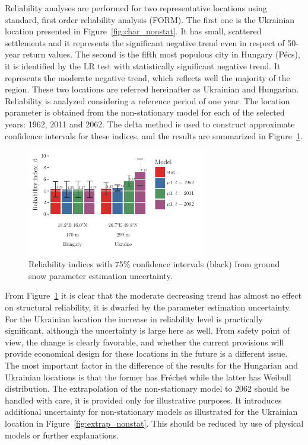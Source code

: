 Reliability analyses are performed for two representative locations using standard, first order reliability analysis (FORM). The first one is the Ukrainian location presented in Figure~\ref{fig:char_nonstat}. It has small, scattered settlements and it represents the significant negative trend even in respect of 50-year return values. The second is the fifth most populous city in Hungary (Pécs), it is identified by the LR test with statistically significant negative trend. It represents the moderate negative trend, which reflects well the majority of the region. These two locations are referred hereinafter as Ukrainian and Hungarian. Reliability is analyzed considering a reference period of one year. The location parameter is obtained from the non-stationary model for each of the selected years: 1962, 2011 and 2062. The delta method is used to construct approximate confidence intervals for these indices, and the results are summarized in Figure~\ref{fig:beta_nonstat}.

\begin{figure}[htbp!]
	\centering
	\includegraphics[width=0.7\textwidth]{beta_values_stat_nonstat.pdf}
	\caption{Reliability indices with 75\% confidence intervals (black) from ground snow parameter estimation uncertainty.}
	\label{fig:beta_nonstat}
\end{figure}

From Figure~\ref{fig:beta_nonstat} it is clear that the moderate decreasing trend has almost no effect on structural reliability, it is dwarfed by the parameter estimation uncertainty. For the Ukrainian location the increase in reliability level is practically significant, although the uncertainty is large here as well. From safety point of view, the change is clearly favorable, and whether the current provisions will provide economical design for these locations in the future is a different issue. The most important factor in the difference of the results for the Hungarian and Ukrainian locations is that the former has Fréchet while the latter has Weibull distribution.
The extrapolation of the non-stationary model to 2062 should be handled with care, it is provided only for illustrative purposes. It introduces additional uncertainty for non-stationary models as illustrated for the Ukrainian location in Figure~\ref{fig:extrap_nonstat}. This should be reduced by use of physical models or further explanations. 

